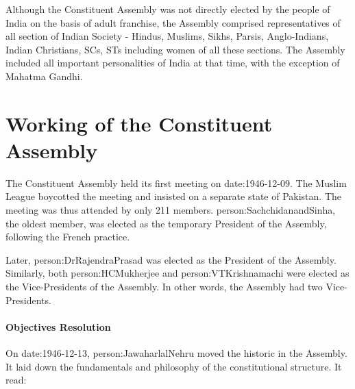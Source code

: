 Although the Constituent Assembly was not directly elected by the people of India on the basis of adult franchise, the Assembly comprised representatives of all section of Indian Society - Hindus, Muslims, Sikhs, Parsis, Anglo-Indians, Indian Christians, SCs, STs including women of all these sections. The Assembly included all important personalities of India at that time, with the exception of Mahatma Gandhi.

\section{Working of the Constituent Assembly}

The Constituent Assembly held its first meeting on \gls{date:1946-12-09}. The Muslim League boycotted the meeting and insisted on a separate state of Pakistan. The meeting was thus attended by only 211 members. {\gls{person:SachchidanandSinha}, the oldest member, was elected as the temporary President of the Assembly, following the French practice.}

Later, \gls{person:DrRajendraPrasad} was elected as the President of the Assembly. Similarly, both \gls{person:HCMukherjee} and \gls{person:VTKrishnamachi} were elected as the Vice-Presidents of the Assembly. In other words, the Assembly had two Vice-Presidents.

\paragraph{Objectives Resolution}

On \gls{date:1946-12-13}, \gls{person:JawaharlalNehru} moved the historic  in the Assembly. It laid down the fundamentals and philosophy of the constitutional structure. It read:

